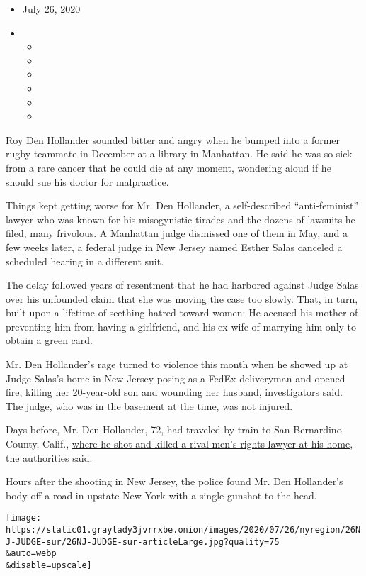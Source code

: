 \begin{itemize}
\item
  July 26, 2020
\item
  \begin{itemize}
  \item
  \item
  \item
  \item
  \item
  \item
  \end{itemize}
\end{itemize}

Roy Den Hollander sounded bitter and angry when he bumped into a former
rugby teammate in December at a library in Manhattan. He said he was so
sick from a rare cancer that he could die at any moment, wondering aloud
if he should sue his doctor for malpractice.

Things kept getting worse for Mr. Den Hollander, a self-described
``anti-feminist'' lawyer who was known for his misogynistic tirades and
the dozens of lawsuits he filed, many frivolous. A Manhattan judge
dismissed one of them in May, and a few weeks later, a federal judge in
New Jersey named Esther Salas canceled a scheduled hearing in a
different suit.

The delay followed years of resentment that he had harbored against
Judge Salas over his unfounded claim that she was moving the case too
slowly. That, in turn, built upon a lifetime of seething hatred toward
women: He accused his mother of preventing him from having a girlfriend,
and his ex-wife of marrying him only to obtain a green card.

Mr. Den Hollander's rage turned to violence this month when he showed up
at Judge Salas's home in New Jersey posing as a FedEx deliveryman and
opened fire, killing her 20-year-old son and wounding her husband,
investigators said. The judge, who was in the basement at the time, was
not injured.

Days before, Mr. Den Hollander, 72, had traveled by train to San
Bernardino County, Calif.,
\href{https://www.nytimes3xbfgragh.onion/2020/07/22/nyregion/roy-den-hollander-esther-salas.html}{where
he shot and killed a rival men's rights lawyer at his home}, the
authorities said.

Hours after the shooting in New Jersey, the police found Mr. Den
Hollander's body off a road in upstate New York with a single gunshot to
the head.

\texttt{[image: https://static01.graylady3jvrrxbe.onion/images/2020/07/26/nyregion/26NJ-JUDGE-sur/26NJ-JUDGE-sur-articleLarge.jpg?quality=75\\\&auto=webp\\\&disable=upscale]}

